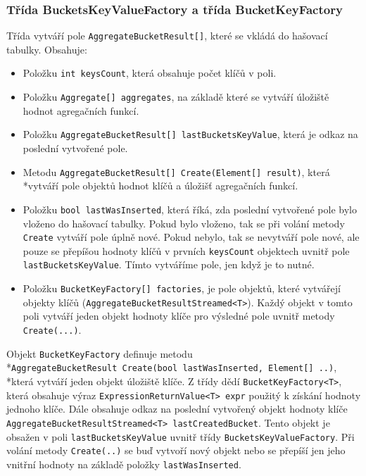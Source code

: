 \subsubsection{Třída BucketsKeyValueFactory a třída BucketKeyFactory}

Třída vytváří pole \texttt{AggregateBucketResult[]}, které se vkládá do hašovací tabulky.
Obsahuje:
\begin{itemize}
\item Položku \texttt{int keysCount}, která obsahuje počet klíčů v poli.
\item Položku \texttt{Aggregate[] aggregates}, na základě které se vytváří úložiště hodnot agregačních funkcí.
\item Položku \texttt{AggregateBucketResult[] lastBucketsKeyValue}, která je odkaz na poslední vytvořené pole.
\item Metodu \texttt{AggregateBucketResult[] Create(Element[] result)}, která \\*vytváří pole objektů hodnot klíčů a úložišť agregačních funkcí.
\item Položku \texttt{bool lastWasInserted}, která říká, zda poslední vytvořené pole bylo vloženo do hašovací tabulky.
Pokud bylo vloženo, tak se při volání metody \texttt{Create} vytváří pole úplně nové.
Pokud nebylo, tak se nevytváří pole nové, ale pouze se přepíšou hodnoty klíčů v prvních \texttt{keysCount} objektech uvnitř pole \texttt{lastBucketsKeyValue}.
Tímto vytváříme pole, jen když je to nutné.
\item Položku \texttt{BucketKeyFactory[] factories}, je pole objektů, které vytvářejí objekty klíčů (\texttt{AggregateBucketResultStreamed<T>}).
Každý objekt v tomto poli vytváří jeden objekt hodnoty klíče pro výsledné pole uvnitř metody \texttt{Create(...)}.
\end{itemize}
Objekt \texttt{BucketKeyFactory} definuje metodu \\*\texttt{AggregateBucketResult Create(bool lastWasInserted, Element[] ..)}, \\*která vytváří jeden objekt úložiště klíče.
Z třídy dědí \texttt{BucketKeyFactory<T>}, která obsahuje výraz \texttt{ExpressionReturnValue<T> expr} použitý k získání hodnoty jednoho klíče.
Dále obsahuje odkaz na poslední vytvořený objekt hodnoty klíče \texttt{AggregateBucketResultStreamed<T> lastCreatedBucket}.
Tento objekt je obsažen v poli \texttt{lastBucketsKeyValue} uvnitř třídy \texttt{BucketsKeyValueFactory}.
Při volání metody \texttt{Create(..)} se buď vytvoří nový objekt nebo se přepíší jen jeho vnitřní hodnoty na základě položky \texttt{lastWasInserted}.

